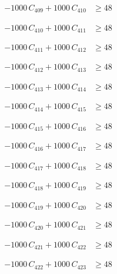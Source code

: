 \documentclass[a4paper,11pt]{article}
\begin{document}
\begin{align}
-1000\,C_{409} + 1000\,C_{410} &\geq 48 \nonumber
\end{align}

\begin{align}
-1000\,C_{410} + 1000\,C_{411} &\geq 48 \nonumber
\end{align}

\begin{align}
-1000\,C_{411} + 1000\,C_{412} &\geq 48 \nonumber
\end{align}

\begin{align}
-1000\,C_{412} + 1000\,C_{413} &\geq 48 \nonumber
\end{align}

\begin{align}
-1000\,C_{413} + 1000\,C_{414} &\geq 48 \nonumber
\end{align}

\begin{align}
-1000\,C_{414} + 1000\,C_{415} &\geq 48 \nonumber
\end{align}

\begin{align}
-1000\,C_{415} + 1000\,C_{416} &\geq 48 \nonumber
\end{align}

\begin{align}
-1000\,C_{416} + 1000\,C_{417} &\geq 48 \nonumber
\end{align}

\begin{align}
-1000\,C_{417} + 1000\,C_{418} &\geq 48 \nonumber
\end{align}

\begin{align}
-1000\,C_{418} + 1000\,C_{419} &\geq 48 \nonumber
\end{align}

\begin{align}
-1000\,C_{419} + 1000\,C_{420} &\geq 48 \nonumber
\end{align}

\begin{align}
-1000\,C_{420} + 1000\,C_{421} &\geq 48 \nonumber
\end{align}

\begin{align}
-1000\,C_{421} + 1000\,C_{422} &\geq 48 \nonumber
\end{align}

\begin{align}
-1000\,C_{422} + 1000\,C_{423} &\geq 48 \nonumber
\end{align}
\end{document}
